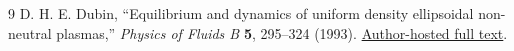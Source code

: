 \documentclass[10pt,a4paper]{article}
\begin{document}
\begin{thebibliography}{9}
D. H. E. Dubin, ``Equilibrium and dynamics of uniform density ellipsoidal
non-neutral plasmas,'' \emph{Physics of Fluids B} \textbf{5}, 295--324 (1993).
\href{https://nnp.ucsd.edu/pdf_files/PFB_5_295_1993.PDF}{Author-hosted full text}.
\end{thebibliography}
\end{document}
